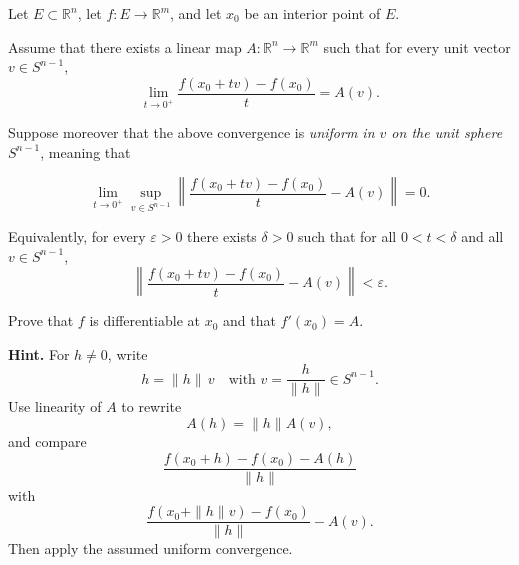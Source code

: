 \begin{problem}
    Let $E\subset \mathbb{R}^n$, let $f:E\to \mathbb{R}^m$, and let $x_0$ be an interior point of $E$.

Assume that there exists a linear map $A:\mathbb{R}^n\to \mathbb{R}^m$
such that for every unit vector $v\in S^{n-1}$,
\[
\lim_{t\to 0^+}
\frac{f(x_0+t v)-f(x_0)}{t}
=
A(v).
\]

Suppose moreover that the above convergence is \emph{uniform in $v$ on the unit sphere $S^{n-1}$}, meaning that

\[
\lim_{t\to 0^+}
\sup_{v\in S^{n-1}}
\left\|
\frac{f(x_0+t v)-f(x_0)}{t}
-
A(v)
\right\|
=
0.
\]

Equivalently, for every $\varepsilon>0$ there exists $\delta>0$
such that for all $0<t<\delta$ and all $v\in S^{n-1}$,
\[
\left\|
\frac{f(x_0+t v)-f(x_0)}{t}
-
A(v)
\right\|
<
\varepsilon.
\]

Prove that $f$ is differentiable at $x_0$ and that $f'(x_0)=A$.

\medskip
\noindent\textbf{Hint.}
For $h\neq 0$, write
\[
h=\|h\|\,v
\quad \text{with } v=\frac{h}{\|h\|}\in S^{n-1}.
\]
Use linearity of $A$ to rewrite
\[
A(h)=\|h\|A(v),
\]
and compare
\[
\frac{f(x_0+h)-f(x_0)-A(h)}{\|h\|}
\]
with
\[
\frac{f(x_0+\|h\|v)-f(x_0)}{\|h\|}-A(v).
\]
Then apply the assumed uniform convergence.
\end{problem}

